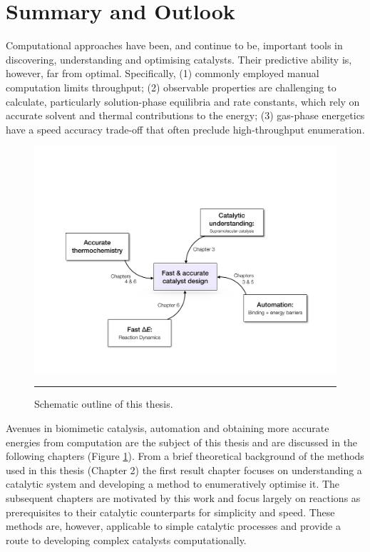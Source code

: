 \documentclass[../main.tex]{subfiles}
\begin{document}
\section{Summary and Outlook}

Computational approaches have been, and continue to be, important tools in discovering, understanding and optimising catalysts. Their predictive ability is, however, far from optimal. Specifically, (1) commonly employed manual computation limits throughput; (2) observable properties are challenging to calculate, particularly solution-phase equilibria and rate constants, which rely on accurate solvent and thermal contributions to the energy; (3) gas-phase energetics have a speed accuracy trade-off that often preclude high-throughput enumeration.

\begin{figure}[h!]
	\centering
	\vspace{0.1cm}
	\includegraphics[width=12.5cm]{1/figs/fig3/outline.pdf}
	\vspace{0.2cm}
	\hrule
	\caption{Schematic outline of this thesis.}
	\label{fig::intro_2}
\end{figure}

Avenues in biomimetic catalysis, automation and obtaining more accurate energies from computation are the subject of this thesis and are discussed in the following chapters (Figure \ref{fig::intro_2}). From a brief theoretical background of the methods used in this thesis (Chapter 2) the first result chapter focuses on understanding a catalytic system and developing a method to enumeratively optimise it. The subsequent chapters are motivated by this work and focus largely on reactions as prerequisites to their catalytic counterparts for simplicity and speed. These methods are, however, applicable to simple catalytic processes and provide a route to developing complex catalysts computationally.









\clearpage
\end{document}

